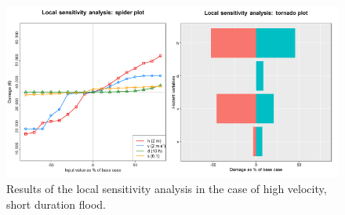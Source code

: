\documentclass[gc, manuscript]{copernicus}
\begin{document}
\begin{figure}
\includegraphics[width=13cm]{fig3} \caption{Results of the local sensitivity analysis in the case of high velocity, short duration flood.}\label{fig:unnamed-chunk-4}
\end{figure}










\competinginterests{} %









\end{document}
